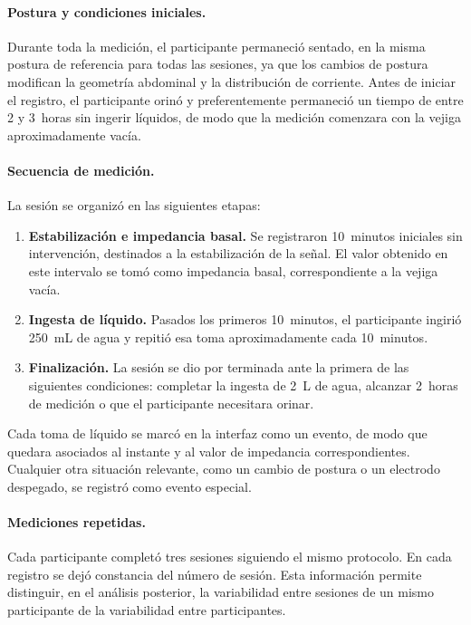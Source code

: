 \documentclass[12pt,a4paper]{article}
\begin{document}
\paragraph{Postura y condiciones iniciales.}
Durante toda la medición, el participante permaneció sentado, en la misma postura de referencia
para todas las sesiones, ya que los cambios de postura modifican la geometría abdominal y la
distribución de corriente. Antes de iniciar el registro, el participante orinó y preferentemente permaneció un
tiempo de entre 2 y 3~horas sin ingerir líquidos, de modo que la medición comenzara con la vejiga aproximadamente vacía.

\paragraph{Secuencia de medición.}
La sesión se organizó en las siguientes etapas:
\begin{enumerate}
    \item \textbf{Estabilización e impedancia basal.} Se registraron 10~minutos iniciales sin
    intervención, destinados a la estabilización de la señal. El valor obtenido en este intervalo
    se tomó como impedancia basal, correspondiente a la vejiga vacía.
    \item \textbf{Ingesta de líquido.} Pasados los primeros 10~minutos, el participante ingirió
    250~mL de agua y repitió esa toma aproximadamente cada 10~minutos.
    \item \textbf{Finalización.} La sesión se dio por terminada ante la primera de las siguientes
    condiciones: completar la ingesta de 2~L de agua, alcanzar 2~horas de medición o que el participante
    necesitara orinar.
\end{enumerate}

Cada toma de líquido se marcó en la interfaz como un evento, de modo que quedara asociados al instante y al valor de impedancia
correspondientes. Cualquier otra situación relevante, como un cambio de postura o un electrodo
despegado, se registró como evento especial.

\paragraph{Mediciones repetidas.}
Cada participante completó tres sesiones siguiendo el mismo protocolo. En cada registro se dejó
constancia del número de sesión. Esta información permite distinguir, en el análisis posterior, la
variabilidad entre sesiones de un mismo participante de la variabilidad entre participantes. 
\end{document}

